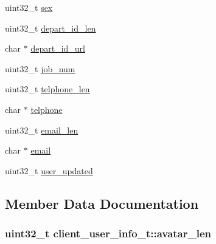 \begin{DoxyCompactItemize}
\item 
uint32\+\_\+t \hyperlink{structclient__user__info__t_a7afcf749a6d4e89a8b5b71abbed8a5b4}{sex}
\item 
uint32\+\_\+t \hyperlink{structclient__user__info__t_ab54d69c30ff05189e1b059b4fe4ce229}{depart\+\_\+id\+\_\+len}
\item 
char $\ast$ \hyperlink{structclient__user__info__t_ad7396b5a3c544213a21cbf78eaf43373}{depart\+\_\+id\+\_\+url}
\item 
uint32\+\_\+t \hyperlink{structclient__user__info__t_a7ce59eb7ba99e780e6f33233be66b3cf}{job\+\_\+num}
\item 
uint32\+\_\+t \hyperlink{structclient__user__info__t_ac9dc97b7c8a15c2c138d963c9c8df137}{telphone\+\_\+len}
\item 
char $\ast$ \hyperlink{structclient__user__info__t_a9c2823130b1451c2a18011a375e666a1}{telphone}
\item 
uint32\+\_\+t \hyperlink{structclient__user__info__t_acea27bc2ad3e83105a54dfd05ca5d841}{email\+\_\+len}
\item 
char $\ast$ \hyperlink{structclient__user__info__t_adc6d16a13faa8b9c2068ed4d9a4ae013}{email}
\item 
uint32\+\_\+t \hyperlink{structclient__user__info__t_a351bb7c7fe8f4a03fa9af7ac2c89c451}{user\+\_\+updated}
\end{DoxyCompactItemize}


\subsection{Member Data Documentation}
\hypertarget{structclient__user__info__t_a2a1ca30643dac3cfab9b70e2c64b8220}{}
\subsubsection[{avatar\+\_\+len}]{\setlength{\rightskip}{0pt plus 5cm}uint32\+\_\+t client\+\_\+user\+\_\+info\+\_\+t\+::avatar\+\_\+len}\label{structclient__user__info__t_a2a1ca30643dac3cfab9b70e2c64b8220}
\hypertarget{structclient__user__info__t_ad47c2c165c3fb51f40f7444d2bf07ce4}{}
